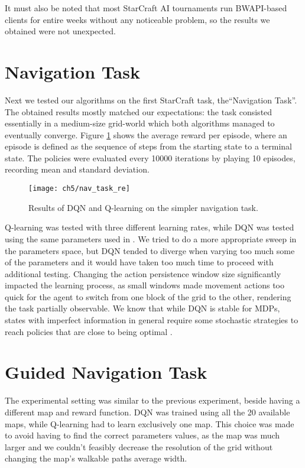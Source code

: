 
It must also be noted that most StarCraft AI tournaments \citep{...} run
BWAPI-based clients for entire weeks without any noticeable problem, so the
results we obtained were not unexpected.

\section{Navigation Task}

Next we tested our algorithms on the first StarCraft task, the``Navigation
Task''. The obtained results mostly matched our expectations: the task consisted
essentially in a medium-size grid-world which both algorithms managed to
eventually converge. Figure \ref{fig:nav_task_results} shows the average reward
per episode, where an episode is defined as the sequence of steps from the
starting state to a terminal state. The policies were evaluated every 10000
iterations by playing 10 episodes, recording mean and standard deviation.

\begin{figure}[h]
    \centering
    \texttt{[image: ch5/nav\_task\_re]}
    \caption{Results of DQN and Q-learning on the simpler navigation task.}
    \label{fig:nav_task_results}
\end{figure}

Q-learning was tested with three different learning rates, while DQN was tested
using the same parameters used in \cite{mnih2015human}. We tried to do a more
appropriate sweep in the parameters space, but DQN tended to diverge when
varying too much some of the parameters and it would have taken too much time to
proceed with additional testing. Changing the action persistence window size
significantly impacted the learning process, as small windows made movement
actions too quick for the agent to switch from one block of the grid to the
other, rendering the task partially observable. We know that while DQN is stable
for MDPs, states with imperfect information in general require some stochastic
strategies to reach policies that are close to being optimal
\citep{heinrich2016deep}.

\section{Guided Navigation Task}

The experimental setting was similar to the previous experiment, beside having a
different map and reward function. DQN was trained using all the 20 available
maps, while Q-learning had to learn exclusively one map. This choice was made to
avoid having to find the correct parameters values, as the map was much larger
and we couldn't feasibly decrease the resolution of the grid without changing
the map's walkable paths average width.

